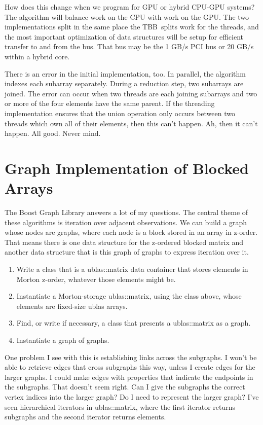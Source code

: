 \documentclass{article}
\newcommand{\TBB}{\textsc{TBB}}
\begin{document}
How does this change when we program for GPU or hybrid CPU-GPU systems? The algorithm will balance work on the CPU with work on the GPU. The two implementations split in the same place the \TBB\ splits work for the threads, and the most important optimization of data structures will be setup for efficient transfer to and from the bus. That bus may be the 1 GB/s PCI bus or 20 GB/s within a hybrid core.

There is an error in the initial implementation, too. In parallel, the algorithm indexes each subarray separately. During a reduction step, two subarrays are joined. The error can occur when two threads are each joining subarrays and two or more of the four elements have the same parent. If the threading implementation ensures that the union operation only occurs between two threads which own all of their elements, then this can't happen. Ah, then it can't happen. All good. Never mind.

\section{Graph Implementation of Blocked Arrays}
The Boost Graph Library answers a lot of my questions. The central theme of these algorithms is iteration over adjacent observations. We can build a graph whose nodes are graphs, where each node is a block stored in an array in z-order. That means there is one data structure for the z-ordered blocked matrix and another data structure that is this graph of graphs to express iteration over it.

\begin{enumerate}
	\item Write a class that is a ublas::matrix data container that stores elements in Morton z-order, whatever those elements might be.
	\item Instantiate a Morton-storage ublas::matrix, using the class above, whose elements are fixed-size ublas arrays.
	\item Find, or write if necessary, a class that presents a ublas::matrix as a graph.
	\item Instantiate a graph of graphs.
\end{enumerate}

One problem I see with this is establishing links across the subgraphs. I won't be able to retrieve edges that cross subgraphs this way, unless I create edges for the larger graphs. I could make edges with properties that indicate the endpoints in the subgraphs. That doesn't seem right. Can I give the subgraphs the correct vertex indices into the larger graph? Do I need to represent the larger graph? I've seen hierarchical iterators in ublas::matrix, where the first iterator returns subgraphs and the second iterator returns elements.
\end{document}
